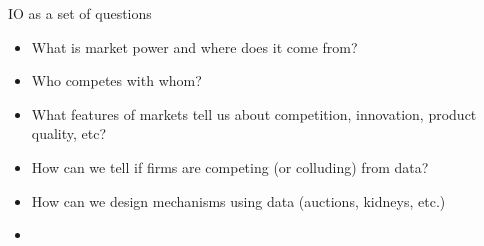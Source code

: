 \begin{frame}{IO as a set of questions}
\begin{itemize}
    \item What is market power and where does it come from?
    \item Who competes with whom?
    \item What features of markets tell us about competition, innovation, product quality, etc?
    \item How can we tell if firms are competing (or colluding) from data?
    \item How can we design mechanisms using data (auctions, kidneys, etc.)
    \item 
\end{itemize}
\end{frame}






















































